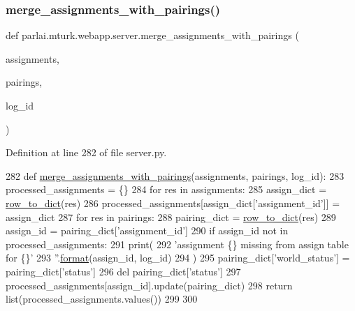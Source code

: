 \subsubsection{\texorpdfstring{merge\+\_\+assignments\+\_\+with\+\_\+pairings()}{merge\_assignments\_with\_pairings()}}
{\footnotesize\ttfamily def parlai.\+mturk.\+webapp.\+server.\+merge\+\_\+assignments\+\_\+with\+\_\+pairings (\begin{DoxyParamCaption}\item[{}]{assignments,  }\item[{}]{pairings,  }\item[{}]{log\+\_\+id }\end{DoxyParamCaption})}



Definition at line 282 of file server.\+py.


\begin{DoxyCode}
282 \textcolor{keyword}{def }\hyperlink{namespaceparlai_1_1mturk_1_1webapp_1_1server_abe6ddbf97d0e5c26315fa927ed076489}{merge\_assignments\_with\_pairings}(assignments, pairings, log\_id):
283     processed\_assignments = \{\}
284     \textcolor{keywordflow}{for} res \textcolor{keywordflow}{in} assignments:
285         assign\_dict = \hyperlink{namespaceparlai_1_1mturk_1_1webapp_1_1server_a92be47964fa33a4b6a14d4069d091c7d}{row\_to\_dict}(res)
286         processed\_assignments[assign\_dict[\textcolor{stringliteral}{'assignment\_id'}]] = assign\_dict
287     \textcolor{keywordflow}{for} res \textcolor{keywordflow}{in} pairings:
288         pairing\_dict = \hyperlink{namespaceparlai_1_1mturk_1_1webapp_1_1server_a92be47964fa33a4b6a14d4069d091c7d}{row\_to\_dict}(res)
289         assign\_id = pairing\_dict[\textcolor{stringliteral}{'assignment\_id'}]
290         \textcolor{keywordflow}{if} assign\_id \textcolor{keywordflow}{not} \textcolor{keywordflow}{in} processed\_assignments:
291             print(
292                 \textcolor{stringliteral}{'assignment \{\} missing from assign table for \{\}'}
293                 \textcolor{stringliteral}{''}.\hyperlink{namespaceparlai_1_1chat__service_1_1services_1_1messenger_1_1shared__utils_a32e2e2022b824fbaf80c747160b52a76}{format}(assign\_id, log\_id)
294             )
295         pairing\_dict[\textcolor{stringliteral}{'world\_status'}] = pairing\_dict[\textcolor{stringliteral}{'status'}]
296         del pairing\_dict[\textcolor{stringliteral}{'status'}]
297         processed\_assignments[assign\_id].update(pairing\_dict)
298     \textcolor{keywordflow}{return} list(processed\_assignments.values())
299 
300 
\end{DoxyCode}
\mbox{\label{namespaceparlai_1_1mturk_1_1webapp_1_1server_a0ce17c85e37b7734ab2fbaca711cb45f}} 
